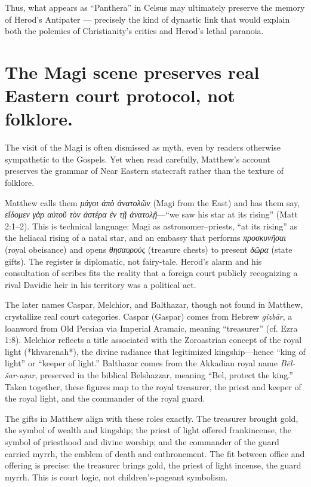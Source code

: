 Thus, what appears as “Panthera” in Celsus may ultimately preserve the memory of Herod’s Antipater — precisely the kind of dynastic link that would explain both the polemics of Christianity’s critics and Herod’s lethal paranoia.

\section{The Magi scene preserves real Eastern court protocol, not folklore.}\label{sec:magi-court-protocol}

The visit of the Magi is often dismissed as myth, even by readers otherwise sympathetic to the Gospels.
Yet when read carefully, Matthew’s account preserves the grammar of Near Eastern statecraft rather than the texture of folklore.

Matthew calls them \textit{μάγοι ἀπὸ ἀνατολῶν} (Magi from the East) and has them say, \textit{εἴδομεν γὰρ αὐτοῦ τὸν ἀστέρα ἐν τῇ ἀνατολῇ}—“we saw his star at its rising” (Matt 2:1–2).
This is technical language: Magi as astronomer–priests, “at its rising” as the heliacal rising of a natal star, and an embassy that performs \textit{προσκυνῆσαι} (royal obeisance) and opens \textit{θησαυρούς} (treasure chests) to present \textit{δῶρα} (state gifts).
The register is diplomatic, not fairy-tale.
Herod’s alarm and his consultation of scribes fits the reality that a foreign court publicly recognizing a rival Davidic heir in his territory was a political act.

The later names Caspar, Melchior, and Balthazar, though not found in Matthew, crystallize real court categories.
Caspar (Gaspar) comes from Hebrew \textit{gizbār}, a loanword from Old Persian via Imperial Aramaic, meaning “treasurer” (cf. Ezra 1:8).
Melchior reflects a title associated with the Zoroastrian concept of the royal light (*khvarenah*), the divine radiance that legitimized kingship—hence “king of light” or “keeper of light.”
Balthazar comes from the Akkadian royal name \textit{Bēl-šar-uṣur}, preserved in the biblical Belshazzar, meaning “Bel, protect the king.”
Taken together, these figures map to the royal treasurer, the priest and keeper of the royal light, and the commander of the royal guard.

The gifts in Matthew align with these roles exactly.
The treasurer brought gold, the symbol of wealth and kingship; the priest of light offered frankincense, the symbol of priesthood and divine worship; and the commander of the guard carried myrrh, the emblem of death and enthronement.
The fit between office and offering is precise: the treasurer brings gold, the priest of light incense, the guard myrrh.
This is court logic, not children’s-pageant symbolism.

